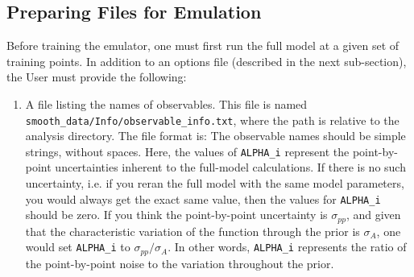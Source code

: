 \documentclass[UserManual.tex]{subfiles}
\begin{document}
\begin{sloppypar}
\subsection{Preparing Files for Emulation}

Before training the emulator, one must first run the full model at a given set of training points. In addition to an options file (described in the next sub-section), the User must provide the following:


\begin{enumerate}\itemsep=0pt
\item A file listing the names of observables. This file is named\\{\tt smooth\_data/Info/observable\_info.txt}, where the path is relative to the analysis directory. The file format is:
\vspace*{-8pt}{\tt \begin{Verbatim}[commandchars=\\\{\}]
   observable_name_1   ALPHA_1
   observable_name_2   ALPHA_1
   .
   observable_name_n   ALPHA_N
\end{Verbatim}
}\vspace*{-8pt}
The observable names should be simple strings, without spaces. Here, the values of {\tt ALPHA\_i} represent the point-by-point uncertainties inherent to the full-model calculations. If there is no such uncertainty, i.e. if you reran the full model with the same model parameters, you would always get the exact same value, then the values for {\tt ALPHA\_i} should be zero. If you think the point-by-point uncertainty is $\sigma_{pp}$, and given that the characteristic variation of the function through the prior is $\sigma_A$, one would set {\tt ALPHA\_i} to $\sigma_{pp}/\sigma_A$. In other words, {\tt ALPHA\_i} represents the ratio of the point-by-point noise to the variation throughout the prior. 


\end{enumerate}
\end{sloppypar}
\end{document}
